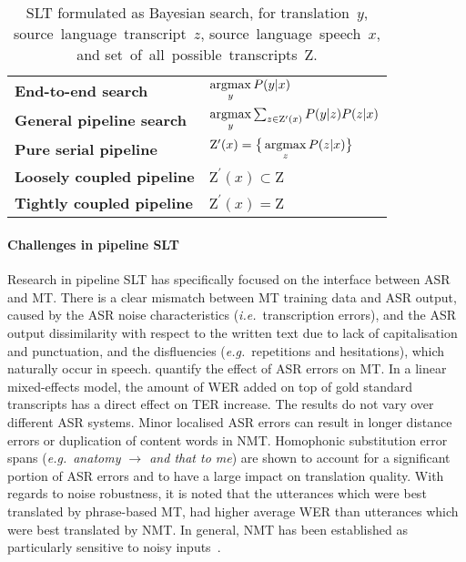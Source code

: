 \documentclass{svjour3}
\newcommand{\ie}[1]{\textit{i.e.}~#1}
\newcommand{\eg}[1]{\textit{e.g.}~#1}
\begin{document}
\begin{table}[t]
    \centering
    \caption{SLT formulated as Bayesian search, for \mbox{translation $y$}, \mbox{source language transcript $z$}, \mbox{source language speech $x$}, and \mbox{set of all possible transcripts $\mathrm{Z}$}.}
    \label{tab:pipeline-slt-search}
    {\renewcommand{\arraystretch}{2}\begin{tabular}{ll@{}}
    \toprule
        \textbf{End-to-end search}          & $\mathop{\mathrm{argmax}}\limits_{y}P(y|x)$ \\
        \textbf{General pipeline search}    & $\mathop{\mathrm{argmax}}\limits_{y}\sum_{z\in\mathrm{Z^\prime}(x)}P(y|z)P(z|x)$ \\
        \textbf{Pure serial pipeline}       & $\mathrm{Z^\prime}(x) = \big\{\mathop{\mathrm{argmax}}\limits_{z}P(z|x)\big\}$ \\
        \textbf{Loosely coupled pipeline}   & $\mathrm{Z^\prime}(x) \subset \mathrm{Z}$ \\
        \textbf{Tightly coupled pipeline}   & $\mathrm{Z^\prime}(x) = \mathrm{Z}$ \\
    \bottomrule
    \end{tabular}
    }
\end{table}


\paragraph{\textbf{Challenges in pipeline SLT}}


Research in pipeline SLT has specifically focused on the interface between ASR and MT. There is a clear mismatch between MT training data and ASR output, caused by the ASR noise characteristics (\ie transcription errors), and the ASR output dissimilarity with respect to the written text due to lack of capitalisation and punctuation, and the disfluencies (\eg repetitions and hesitations), which naturally occur in speech.
\citet{ruiz2014assessing,ruiz2015phonetically,ruiz2017assessing}
quantify the effect of ASR errors on MT. In a linear mixed-effects model, the amount of WER added on top of gold standard transcripts has a direct effect on TER increase. The results do not vary over different ASR systems. Minor localised ASR errors can result in longer distance errors or duplication of content words in NMT. Homophonic substitution error spans (\eg \textit{anatomy $\rightarrow$ and that to me}) are shown to account for a significant portion of ASR errors and to have a large impact on translation quality.
With regards to noise robustness, it is noted that the utterances which were best translated by phrase-based MT, had higher average WER than utterances which were best translated by NMT. In general, NMT has been established as particularly sensitive to noisy inputs~\citep{belinkov2018synthetic,cheng-etal-2018-towards}.
\end{document}
